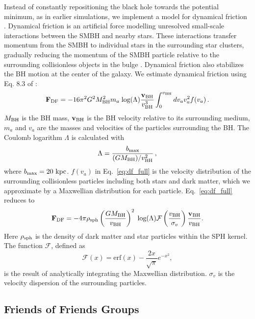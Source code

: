 \documentclass[fleqn,usenatbib]{mnras}
\begin{document}
Instead of constantly repositioning the black hole towards the potential minimum, as in earlier simulations, we implement a model for dynamical friction \citep{Tremmel2015, Tremmel2017, Chen2021}. Dynamical friction is an artificial force modelling unresolved small-scale interactions between the SMBH and nearby stars. These interactions transfer momentum from the SMBH to individual stars in the surrounding star clusters,  gradually reducing the momentum of the SMBH particle relative to the surrounding collisionless objects in the bulge \citep[e.g.][]{Governato1994,Kazantzidis2005}. Dynamical friction also stabilizes the BH motion at the center of the galaxy. We estimate dynamical friction using Eq. 8.3 of \cite{Binney2008}: 
\begin{equation}
\label{eq:df_full}
    \mathbf{F}_{\rm DF} = -16\pi^2 G^2 M_{\rm BH}^2 m_{a} \;\text{log}(\Lambda) \frac{\mathbf{v}_{\rm BH}}{v_{\rm BH}^3} \int_0^{v_{\rm BH}} dv_a v_a^2 f(v_a)\,.
\end{equation}
$M_{\rm BH}$ is the BH mass, $\textbf{v}_{\rm BH}$ is the BH velocity relative to its surrounding medium, $m_a$ and $v_a$ are the masses and velocities of the particles surrounding the BH. The Coulomb logarithm $\Lambda$ is calculated with
\begin{equation}
    \Lambda = \frac{b_{\rm max}}{(GM_{\rm BH})/v_{\rm BH}^2}\,,
\end{equation}
where $b_{\rm max} = 20\text{ kpc}$.
$f(v_a)$ in Eq.~\ref{eq:df_full} is the velocity distribution of the surrounding collisionless particles including both stars and dark matter, which we approximate by a Maxwellian distribution for each particle. 
Eq.~\ref{eq:df_full} reduces to
\begin{equation}
    \label{eq:H14}
    \mathbf{F}_{\rm DF} = -4\pi \rho_{\rm sph} \left(\frac{GM_{\rm BH}}{v_{\rm BH}}\right)^2  \;\text{log}(\Lambda) \mathcal{F}\left(\frac{v_{\rm BH}}{\sigma_v}\right) \frac{\bf{v}_{\rm BH}}{v_{\rm BH}}.
\end{equation}
Here $\rho_{\rm sph}$ is the density of dark matter and star particles within the SPH kernel. 
The function $\mathcal{F}$, defined as
\begin{equation}
    \label{eq:fx}
    \mathcal{F}(x) =  \text{erf}(x)-\frac{2x}{\sqrt{\pi}} e^{-x^2},
\end{equation}
is the result of analytically integrating the Maxwellian distribution. $\sigma_v$ is the velocity dispersion of the surrounding particles.

\subsection{Friends of Friends Groups}
\label{sec:fof}
\end{document}
